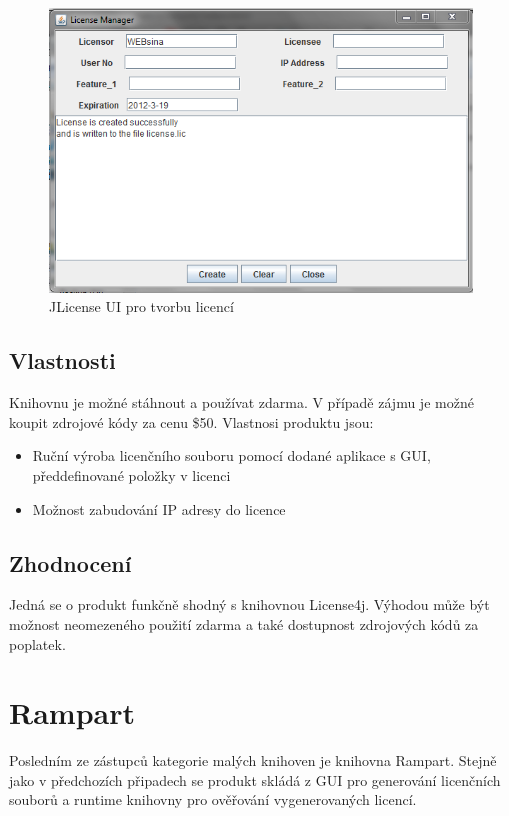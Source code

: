 \begin{figure}[H]
\begin{center}
\includegraphics[width=12cm]{figures/jlicense.PNG}
\caption{JLicense UI pro tvorbu licencí}
\label{fig:jlicense-ui} 
\end{center}
\end{figure}

\subsection*{Vlastnosti}
Knihovnu je možné stáhnout a používat zdarma. V případě zájmu je možné koupit
zdrojové kódy za cenu \$50. Vlastnosi produktu jsou:

\begin{itemize}
  \item Ruční výroba licenčního souboru pomocí dodané aplikace s GUI,
  předdefinované položky v licenci
  \item Možnost zabudování IP adresy do licence
\end{itemize}

\subsection*{Zhodnocení}
Jedná se o produkt funkčně shodný s knihovnou License4j. Výhodou může být
možnost neomezeného použití zdarma a také dostupnost zdrojových kódů za
poplatek.


\section{Rampart}
Posledním ze zástupců kategorie malých knihoven je knihovna
Rampart\cite{rampart}. Stejně jako v předchozích připadech se produkt skládá z
GUI pro generování licenčních souborů a runtime knihovny pro ověřování
vygenerovaných licencí.

